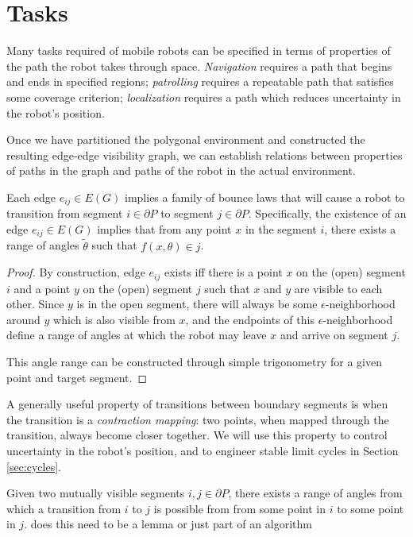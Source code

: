 \documentclass[]{styles/svproc}  %
\begin{document}
\section{Tasks}

Many tasks required of mobile robots can be specified in terms of properties of
the path the robot takes through space. \emph{Navigation} requires a path that
begins and ends in specified regions; \emph{patrolling} requires a repeatable
path that satisfies some coverage criterion; \emph{localization} requires a path
which reduces uncertainty in the robot's position.

Once we have partitioned the polygonal environment and constructed the resulting
edge-edge visibility graph, we can establish relations between properties of
paths in the graph and paths of the robot in the actual environment.

\begin{lemma}\label{lemma:transition}
Each edge $e_{ij} \in E(G)$ implies a family of bounce laws that will cause a
robot to transition from segment $i \in \partial P$ to segment $j \in \partial
P$. Specifically, the existence of an edge $e_{ij} \in E(G)$ implies that from any
point $x$ in the segment $i$, there exists a range of angles $\tilde{\theta}$
such that $f(x,\theta) \in j$.
\end{lemma}

\begin{proof}
By construction, edge $e_{ij}$ exists iff there is a point $x$ on the (open)
segment $i$ and a point $y$ on the (open) segment $j$ such that $x$ and $y$ are
visible to each other. Since $y$ is in the open segment, there will always be some $\epsilon$-neighborhood around
$y$ which is also visible from $x$, and the endpoints of this
$\epsilon$-neighborhood define a range of angles at which the robot may leave
$x$ and arrive on segment $j$.

This angle range can be constructed through simple trigonometry for a
given point and target segment.
\end{proof}

A generally useful property of transitions between boundary segments is when the
transition is a \emph{contraction mapping}: two points, when mapped through the
transition, always become closer together. We will use this property to control
uncertainty in the robot's position, and to engineer stable limit cycles in
Section \ref{sec:cycles}.

\begin{lemma} \label{lemma:angrange}
Given two mutually visible segments $i,j \in \partial P$, there exists a range 
of angles from which a transition from $i$ to $j$ is possible from from some
point in $i$ to some point in $j$.
{\color{red} does this need to be a lemma or just part of an algorithm}
\end{lemma}
\end{document}
